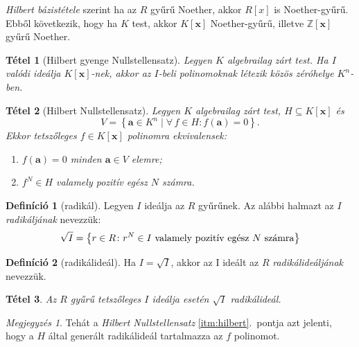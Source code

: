 \documentclass[DIV=15,appendixprefix]{scrreprt}
\newtheorem*{tetel}{Tétel}
\theoremstyle{definition}
\newtheorem*{defin}{Definíció}
\theoremstyle{remark}
\newtheorem*{megj}{Megjegyzés}
\begin{document}
\emph{Hilbert bázistétele} szerint ha az $ R $ gyűrű Noether, akkor $ R \left[ x \right] $ is
Noether-gyűrű. Ebből következik, hogy ha $ K $ test, akkor $ K \left[ \mathbf{ x } \right] $
Noether-gyűrű, illetve $ \mathbb{ Z } \left[ \mathbf{ x } \right] $ gyűrű Noether.
%
\begin{tetel}[Hilbert gyenge Nullstellensatz]
	Legyen $ K $ algebrailag zárt test. Ha $ I $ valódi ideálja $ K \left[ \mathbf{ x }
	\right] $-nek, akkor az $ I $-beli polinomoknak létezik közös zéróhelye $ K^{ n } $-ben.
\end{tetel}

\begin{tetel}[Hilbert Nullstellensatz]
	Legyen $ K $ algebrailag zárt test, $ H \subseteq K \left[ \mathbf{ x } \right] $ és
	\begin{equation*}
		V = \left\{ \mathbf{ a } \in K^{ n } \mid \forall\,f \in H \colon f \left( \mathbf{ a }
		\right) = 0 \right\}.
	\end{equation*}
	Ekkor tetszőleges $ f \in K \left[ \mathbf{ x } \right] $ polinomra ekvivalensek:
	\begin{enumerate}
		\item $f \left( \mathbf{ a } \right) = 0$ minden $ \mathbf{ a } \in V $ elemre;
		\item\label{itm:hilbert} $f^{ N } \in H $ valamely pozitív egész $ N $ számra.
	\end{enumerate}
\end{tetel}
%
\begin{defin}[radikál]
	Legyen $ I $ ideálja az $ R $ gyűrűnek. Az alábbi halmazt az $ I $ \emph{radikáljának} nevezzük:
	\begin{equation*}
		\sqrt{ I } = \left\{ r \in R \colon r^N \in I\text{ valamely pozitív egész $ N $ számra}
		\right\}
	\end{equation*}
\end{defin}
\begin{defin}[radikálideál]
	Ha $ I = \sqrt{ I }$, akkor az I ideált az $ R $ \emph{radikálideáljának} nevezzük.
\end{defin}
\begin{tetel}
	Az $ R $ gyűrű tetszőleges $ I $ ideálja esetén $ \sqrt{ I } $ radikálideál.
\end{tetel}
\begin{megj}
	Tehát a \emph{Hilbert Nullstellensatz} \ref{itm:hilbert}.~pontja azt jelenti, hogy a $ H $ által
	generált radikálideál tartalmazza az $ f $ polinomot.
\end{megj}
\end{document}
